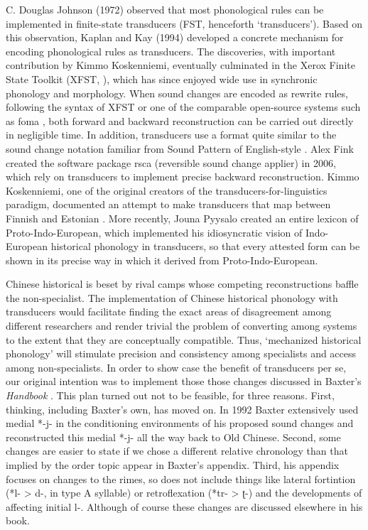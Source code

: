 \documentclass[xetex, svgnames, 12pt]{scrartcl}
\newcounter{para}
\begin{document}
\citep{Johnson1972FormalAspects}
C. Douglas Johnson (1972) observed that most phonological rules can be implemented in 
finite-state transducers (FST, henceforth `transducers'). Based on this observation, Kaplan and Kay (1994) developed a concrete mechanism for encoding phonological rules as transducers. The discoveries, with important contribution by Kimmo Koskenniemi, eventually culminated in the Xerox Finite State Toolkit (XFST, 
\citet[]{Beesley2003FiniteSM}), which has since enjoyed wide use in synchronic phonology and morphology. When sound changes are encoded as rewrite rules, following the syntax of XFST or one of the comparable open-source systems such as foma 
\citep{Hulden2009}, both forward and backward reconstruction can be carried out directly in negligible time. 
In addition, transducers use a format quite similar to the sound change notation familiar from Sound Pattern of English-style 
\citep{Chomsky1968}. 
Alex Fink created the software package rsca (reversible sound change applier) in 2006, which rely on transducers to implement precise backward reconstruction. Kimmo Koskenniemi, one of the original creators of the transducers-for-linguistics paradigm, documented an attempt to make transducers that map between Finnish and Estonian 
\citep{Koskenniemi2013FinitestateRB}. More recently, Jouna Pyysalo created an entire lexicon of Proto-Indo-European, which implemented his idiosyncratic vision of Indo-European historical phonology in transducers, so that every attested form can be shown in its precise way in which it derived from Proto-Indo-European.

Chinese historical is beset by rival camps whose competing reconstructions baffle the non-specialist. The implementation of Chinese historical phonology with transducers would facilitate finding the exact areas of disagreement among different researchers and render trivial the problem of converting among systems to the extent that they are conceptually compatible. Thus, `mechanized historical phonology' will stimulate precision and consistency among specialists and access among non-specialists. In order to show case the benefit of transducers per se, our original intention was to implement those those changes discussed in Baxter's  \textit{Handbook} \citeyear[]{Baxter1992}. This plan turned out not to be feasible, for three reasons. First, thinking, including Baxter's own, has moved on. In 1992 Baxter extensively used medial *-j- in the conditioning environments of his proposed sound changes and reconstructed this medial *-j- all the way back to Old Chinese. Second, some changes are easier to state if we chose a different relative chronology than that implied by the order topic appear in Baxter's appendix. Third, his  appendix focuses on changes to the rimes, so does not include things like lateral fortintion (*l- > d-, in type A syllable) or retroflexation (*tr- > ʈ-) and the developments of affecting initial l-. Although of course these changes are discussed elsewhere in his book.
\end{document}
